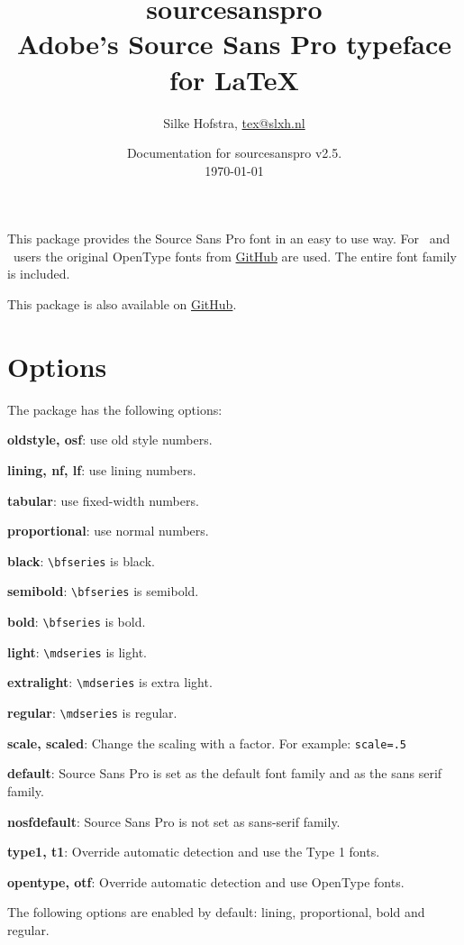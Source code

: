 \documentclass[10pt,a4paper,english]{article}
\title{\bfseries
	\Huge sourcesanspro\\
	\Large Adobe's Source Sans Pro typeface for \LaTeX
}
\author{Silke Hofstra, \href{mailto:tex@slxh.nl}{tex@slxh.nl}}
\date{Documentation for sourcesanspro v2.5.\\ \today}
\begin{document}
\maketitle
\begin{multicols}{2}
This package provides the Source Sans Pro font in an easy to use way. For \XeLaTeX\ and \LuaLaTeX\ users the original OpenType fonts from \href{https://github.com/adobe-fonts/source-sans-pro}{GitHub} are used. The entire font family is included.

This package is also available on \href{https://github.com/silkeh/latex-sourcesanspro}{GitHub}.


\section{Options}
The package has the following options:
\begin{itemize*}
	\item \textbf{oldstyle, osf}:  use old style numbers.
	\item \textbf{lining, nf, lf}: use lining numbers.
	\item \textbf{tabular}:        use fixed-width numbers.
	\item \textbf{proportional}:   use normal numbers.
	\item \textbf{black}:          \texttt{\textbackslash bfseries} is black.
	\item \textbf{semibold}:       \texttt{\textbackslash bfseries} is semibold.
	\item \textbf{bold}:           \texttt{\textbackslash bfseries} is bold.
	\item \textbf{light}:          \texttt{\textbackslash mdseries} is light.
	\item \textbf{extralight}:     \texttt{\textbackslash mdseries} is extra light.
	\item \textbf{regular}:        \texttt{\textbackslash mdseries} is regular.
	\item \textbf{scale, scaled}:  Change the scaling with a factor. For example:  \texttt{scale=.5}
	\item \textbf{default}:        Source Sans Pro is set as the default font family and as the sans serif family.
	\item \textbf{nosfdefault}:    Source Sans Pro is not set as sans-serif family.
	\item \textbf{type1, t1}:      Override automatic detection and use the Type 1 fonts.
	\item \textbf{opentype, otf}:  Override automatic detection and use OpenType fonts.
\end{itemize*}
The following options are enabled by default: lining, proportional, bold and regular.


\end{multicols}
\end{document}
